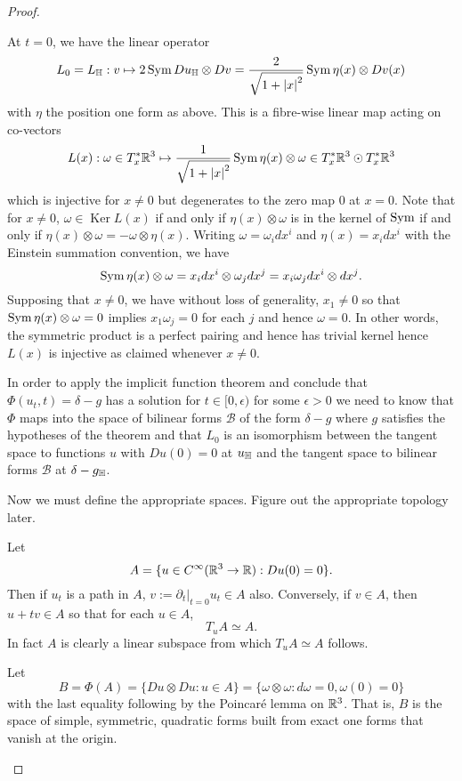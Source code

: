 \documentclass[a4paper, 12pt]{amsart}
\begin{document}
\begin{proof}
\begin{enumerate}
At \(t=0\), we have the linear operator
\[
L_0 = L_{\mathbb{H}} : v \mapsto 2 \operatorname{Sym} Du_{\mathbb{H}} \otimes Dv = \frac{2}{\sqrt{1 + \left\lvert{x}\right\rvert^2}} \operatorname{Sym} \eta(x) \otimes Dv(x)
\]
with \(\eta\) the position one form as above. This is a fibre-wise linear map acting on co-vectors
\[
L(x) : \omega \in T_x^{\ast} \mathbb{R}^3 \mapsto \frac{1}{\sqrt{1 + \left\lvert{x}\right\rvert^2}} \operatorname{Sym} \eta(x) \otimes \omega \in T^{\ast}_x \mathbb{R}^3 \odot T^{\ast}_x \mathbb{R}^3
\]
which is injective for \(x \ne 0\) but degenerates to the zero map \(0\) at \(x = 0\). Note that for \(x \ne 0\), \(\omega \in \operatorname{Ker} L(x)\) if and only if \(\eta(x) \otimes \omega\) is in the kernel of \(\operatorname{Sym}\) if and only if \(\eta(x) \otimes \omega = - \omega \otimes \eta(x)\). Writing \(\omega = \omega_i dx^i\) and \(\eta(x) = x_i dx^i\) with the Einstein summation convention, we have
\[
\operatorname{Sym} \eta(x) \otimes \omega = x_i dx^i \otimes \omega_j dx^j = x_i \omega_j dx^i \otimes dx^j.
\]
Supposing that \(x \ne 0\), we have without loss of generality, \(x_1 \ne 0\) so that \(\operatorname{Sym} \eta(x) \otimes \omega = 0\) implies \(x_1 \omega_j = 0\) for each \(j\) and hence \(\omega = 0\). In other words, the symmetric product is a perfect pairing and hence has trivial kernel hence \(L(x)\) is injective as claimed whenever \(x \ne 0\).

In order to apply the implicit function theorem and conclude that \(\Phi(u_t, t) = \delta - g\) has a solution for \(t \in [0, \epsilon)\) for some \(\epsilon > 0\) we need to know that \(\Phi\) maps into the space of bilinear forms \(\mathcal{B}\) of the form \(\delta - g\) where \(g\) satisfies the hypotheses of the theorem and that \(L_0\) is an isomorphism between the tangent space to functions \(u\) with \(Du (0) = 0\) at \(u_{\mathbb{H}}\) and the tangent space to bilinear forms \(\mathcal{B}\) at \(\delta - g_{\mathbb{H}}\).

Now we must define the appropriate spaces. {\color{red} Figure out the appropriate topology later}.

Let
\[
A = \{u \in C^{\infty}(\mathbb{R}^3 \to \mathbb{R}) : Du(0) = 0\}.
\]
Then if \(u_t\) is a path in \(A\), \(v := \partial_t|_{t=0} u_t \in A\) also. Conversely, if \(v \in A\), then \(u + t v \in A\) so that for each \(u \in A\),
\[
T_u A \simeq A.
\]
In fact \(A\) is clearly a linear subspace from which \(T_u A \simeq A\) follows.

Let
\[
B = \Phi (A) = \{Du \otimes Du : u \in A\} = \{\omega \otimes \omega : d \omega = 0, \omega(0) = 0\}
\]
with the last equality following by the Poincar\'e lemma on \(\mathbb{R}^3\). That is, \(B\) is the space of simple, symmetric, quadratic forms built from exact one forms that vanish at the origin.


\end{enumerate}
\end{proof}
\end{document}
